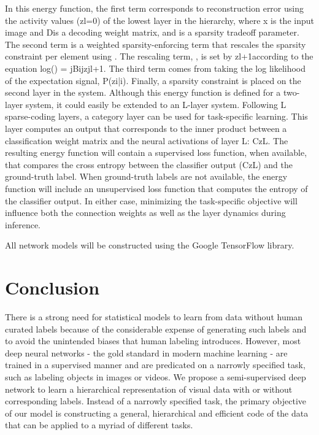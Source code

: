 In this energy function, the first term corresponds to reconstruction error using the activity values (zl=0) of the lowest layer in the hierarchy, where x is the input image and Dis a decoding weight matrix, and is a sparsity tradeoff parameter. The second term is a weighted sparsity-enforcing term that rescales the sparsity constraint per element using . The rescaling term, , is set by zl+1according to the equation log() = jBijzjl+1. The third term comes from taking the log likelihood of the expectation signal, P(zi|i). Finally, a sparsity constraint is placed on the second layer in the system. Although this energy function is defined for a two-layer system, it could easily be extended to an L-layer system. Following L sparse-coding layers, a category layer can be used for task-specific learning. This layer computes an output that corresponds to the inner product between a classification weight matrix and the neural activations of layer L: CzL. The resulting energy function will contain a supervised loss function, when available, that compares the cross entropy between the classifier output (CzL) and the ground-truth label. When ground-truth labels are not available, the energy function will include an unsupervised loss function that computes the entropy of the classifier output. In either case, minimizing the task-specific objective will influence both the connection weights as well as the layer dynamics during inference.

All network models will be constructed using the Google TensorFlow library.


\section{Conclusion}
There is a strong need for statistical models to learn from data without human curated labels because of the considerable expense of generating such labels and to avoid the unintended biases that human labeling introduces. However, most deep neural networks - the gold standard in modern machine learning - are trained in a supervised manner and are predicated on a narrowly specified task, such as labeling objects in images or videos. We propose a semi-supervised deep network to learn a hierarchical representation of visual data with or without corresponding labels. Instead of a narrowly specified task, the primary objective of our model is constructing a general, hierarchical and efficient code of the data that can be applied to a myriad of different tasks.